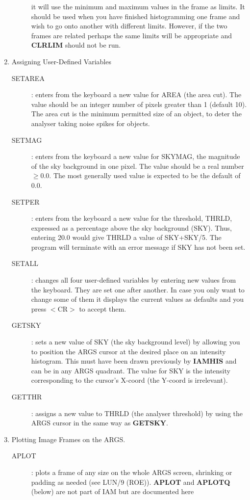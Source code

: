 \begin{enumerate}
\begin{description}
it will use the minimum and maximum values in the frame as limits.
It should be used when you have finished histogramming one frame and wish to go
onto another with different limits.
However, if the two frames are related perhaps the same limits will be
appropriate and {\bf CLRLIM} should not be run.
\end{description}
\item Assigning User-Defined Variables
\begin{description}
\item [SETAREA]:
enters from the keyboard a new value for AREA (the area cut).
The value should be an integer number of pixels greater than 1 (default 10).
The area cut is the minimum permitted size of an object, to deter the analyser
taking noise spikes for objects.
\item [SETMAG]:
enters from the keyboard a new value for SKYMAG, the magnitude of the sky
background in one pixel.
The value should be a real number $\geq0.0$.
The most generally used value is expected to be the default of 0.0.
\item [SETPER]:
enters from the keyboard a new value for the threshold, THRLD, expressed as a
percentage above the sky background (SKY).
Thus, entering 20.0 would give THRLD a value of SKY+SKY/5.
The program will terminate with an error message if SKY has not been set.
\item [SETALL]:
changes all four user-defined variables by entering new values from the
keyboard.
They are set one after another.
In case you only want to change some of them it displays the current values as
defaults and you press $<$CR$>$ to accept them.
\item [GETSKY]:
sets a new value of SKY (the sky background level) by allowing you to position
the ARGS cursor at the desired place on an intensity histogram.
This must have been drawn previously by {\bf IAMHIS} and can be in any ARGS
quadrant.
The value for SKY is the intensity corresponding to the cursor's X-coord (the
Y-coord is irrelevant).
\item [GETTHR]:
assigns a new value to THRLD (the analyser threshold) by using the ARGS cursor
in the same way as {\bf GETSKY}.
\end{description}
\item Plotting Image Frames on the ARGS.
\begin{description}
\item [APLOT]:
plots a frame of any size on the whole ARGS screen, shrinking or padding as
needed (see LUN/9 (ROE)).
{\bf APLOT} and {\bf APLOTQ} (below) are not part of IAM but are documented here

\end{description}
\end{enumerate}
